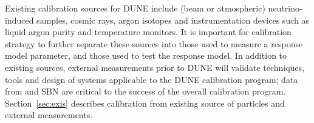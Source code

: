 Existing calibration sources for DUNE include (beam or atmospheric) neutrino-induced samples, cosmic rays, argon isotopes and instrumentation devices such as liquid argon purity and temperature monitors. It is important for calibration strategy to further separate these sources into those used to measure a response model parameter, and those used to test the response model. In addition to existing sources, external measurements prior to DUNE will validate techniques, tools and design of systems applicable to the DUNE calibration program; data from   and SBN are critical to the success of the overall calibration program. %
Section~\ref{sec:exis} describes calibration from existing source of particles and external measurements.



